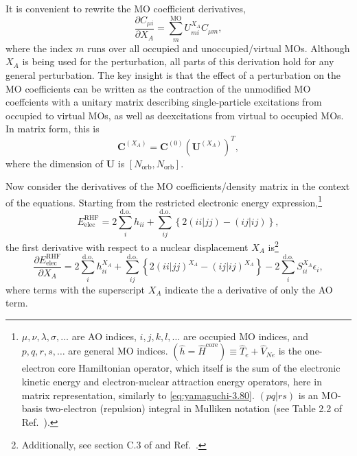 \documentclass[%
class = book,%
crop = false,%
float = true,%
multi = true,%
preview = false,%
]{standalone}
\begin{document}
It is convenient to rewrite the MO coefficient derivatives,
\begin{equation}
  \label{eq:yamaguchi-3.7}\tag{Yamaguchi eq. 3.7}
  \frac{\partial C_{\mu i}}{\partial X_{A}} = \sum_{m}^{\text{MO}} U_{mi}^{X_{A}} C_{\mu m},
\end{equation}
where the index \(m\) runs over all occupied and unoccupied/virtual MOs. Although \(X_{A}\) is being used for the perturbation, all parts of this derivation hold for any general perturbation. The key insight is that the effect of a perturbation on the MO coefficients can be written as the contraction of the unmodified MO coeffcients with a unitary matrix describing single-particle excitations from occupied to virtual MOs, as well as deexcitations from virtual to occupied MOs. In matrix form, this is
\begin{equation}
  \label{eq:mo-coefficient-derivatives}
  \mathbf{C}^{(X_{A})} = \mathbf{C}^{(0)} \left( \mathbf{U}^{(X_{A})} \right)^{T},
\end{equation}
where the dimension of \(\mathbf{U}\) is \([N_{\text{orb}}, N_{\text{orb}}]\).

Now consider the derivatives of the MO coefficients/density matrix in the context of the \hf{} equations. Starting from the restricted \hf{} electronic energy expression,\footnote{\label{foot:hf-basics}\(\mu,\nu,\lambda,\sigma,\dots\) are AO indices, \(i,j,k,l,\dots\) are occupied MO indices, and \(p,q,r,s,\dots\) are general MO indices. \(\left(\hat{h} = \hat{H}^{\text{core}} \right) \equiv \hat{T}_{e} + \hat{V}_{Ne}\) is the one-electron core Hamiltonian operator, which itself is the sum of the electronic kinetic energy and electron-nuclear attraction energy operators, here in matrix representation, similarly to \eqref{eq:yamaguchi-3.80}. \((pq|rs)\) is an MO-basis two-electron (repulsion) integral in Mulliken notation (see Table 2.2 of Ref.~\parencite{szabo1989modern}).}
\begin{equation}
  \label{eq:yamaguchi-4.1}\tag{Yamaguchi eq. 4.1}
  E_{\text{elec}}^{\text{RHF}} = 2 \sum_{i}^{\text{d.o.}} h_{ii} + \sum_{ij}^{\text{d.o.}} \left\{ 2(ii|jj) - (ij|ij) \right\},
\end{equation}
the first derivative with respect to a nuclear displacement \(X_{A}\) is\footnote{Additionally, see section C.3 of \szabo{}\cite{szabo1989modern} and Ref.~\parencite{Pople1979}.}
\begin{equation}
  \label{eq:yamaguchi-4.21}\tag{Yamaguchi eq. 4.21}
  \frac{\partial E_{\text{elec}}^{\text{RHF}}}{\partial X_{A}} = 2 \sum_{i}^{\text{d.o.}} h_{ii}^{X_{A}} + \sum_{ij}^{\text{d.o.}} \left\{ 2(ii|jj)^{X_{A}} - (ij|ij)^{X_{A}} \right\} - 2 \sum_{i}^{\text{d.o.}} S_{ii}^{X_{A}} \epsilon_{i},
\end{equation}
where terms with the superscript \(X_{A}\) indicate the a derivative of only the AO term.
\end{document}
